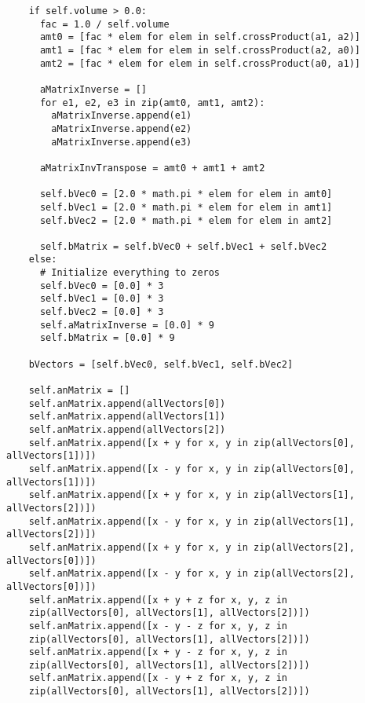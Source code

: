 \begin{verbatim}
    if self.volume > 0.0:
      fac = 1.0 / self.volume
      amt0 = [fac * elem for elem in self.crossProduct(a1, a2)]
      amt1 = [fac * elem for elem in self.crossProduct(a2, a0)]
      amt2 = [fac * elem for elem in self.crossProduct(a0, a1)]
      
      aMatrixInverse = []
      for e1, e2, e3 in zip(amt0, amt1, amt2):
        aMatrixInverse.append(e1)
        aMatrixInverse.append(e2)
        aMatrixInverse.append(e3)
        
      aMatrixInvTranspose = amt0 + amt1 + amt2
      
      self.bVec0 = [2.0 * math.pi * elem for elem in amt0]
      self.bVec1 = [2.0 * math.pi * elem for elem in amt1]
      self.bVec2 = [2.0 * math.pi * elem for elem in amt2]
      
      self.bMatrix = self.bVec0 + self.bVec1 + self.bVec2
    else:
      # Initialize everything to zeros
      self.bVec0 = [0.0] * 3
      self.bVec1 = [0.0] * 3
      self.bVec2 = [0.0] * 3
      self.aMatrixInverse = [0.0] * 9
      self.bMatrix = [0.0] * 9
    
    bVectors = [self.bVec0, self.bVec1, self.bVec2]
    
    self.anMatrix = []
    self.anMatrix.append(allVectors[0])
    self.anMatrix.append(allVectors[1])
    self.anMatrix.append(allVectors[2])
    self.anMatrix.append([x + y for x, y in zip(allVectors[0], allVectors[1])])
    self.anMatrix.append([x - y for x, y in zip(allVectors[0], allVectors[1])])
    self.anMatrix.append([x + y for x, y in zip(allVectors[1], allVectors[2])])
    self.anMatrix.append([x - y for x, y in zip(allVectors[1], allVectors[2])])
    self.anMatrix.append([x + y for x, y in zip(allVectors[2], allVectors[0])])
    self.anMatrix.append([x - y for x, y in zip(allVectors[2], allVectors[0])])
    self.anMatrix.append([x + y + z for x, y, z in 
    zip(allVectors[0], allVectors[1], allVectors[2])])
    self.anMatrix.append([x - y - z for x, y, z in 
    zip(allVectors[0], allVectors[1], allVectors[2])])
    self.anMatrix.append([x + y - z for x, y, z in 
    zip(allVectors[0], allVectors[1], allVectors[2])])
    self.anMatrix.append([x - y + z for x, y, z in 
    zip(allVectors[0], allVectors[1], allVectors[2])])
    

\end{verbatim}
